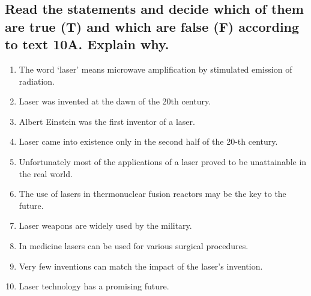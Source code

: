 \documentclass[12pt, a4paper]{report}
\begin{document}
\subsection{Read the statements and decide which of them are true (T) and which are false (F)
    according to text 10A. Explain why.}
\begin{enumerate}
    \item The word ‘laser’ means microwave amplification by stimulated emission of radiation.
    \item Laser was invented at the dawn of the 20th century.
    \item Albert Einstein was the first inventor of a laser.
    \item Laser came into existence only in the second half of the 20-th century.
    \item Unfortunately most of the applications of a laser proved to be unattainable in the real world.
    \item The use of lasers in thermonuclear fusion reactors may be the key to the future.
    \item Laser weapons are widely used by the military.
    \item In medicine lasers can be used for various surgical procedures.
    \item Very few inventions can match the impact of the laser’s invention.
    \item Laser technology has a promising future.
\end{enumerate}
\end{document}
